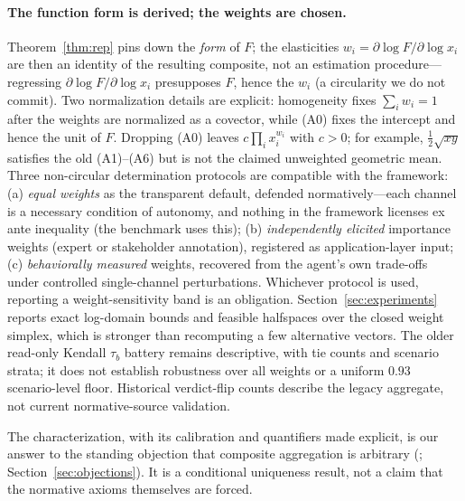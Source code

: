 \paragraph{The function form is derived; the weights are chosen.}
Theorem~\ref{thm:rep} pins down the \emph{form} of $F$; the elasticities
$w_i=\partial\log F/\partial\log x_i$ are then an identity of the resulting
composite, not an estimation procedure---regressing $\partial\log
F/\partial\log x_i$ presupposes $F$, hence the $w_i$ (a circularity we do not
commit). Two normalization details are explicit: homogeneity fixes
$\sum_iw_i=1$ after the weights are normalized as a covector, while (A0)
fixes the intercept and hence the unit of $F$. Dropping (A0) leaves
$c\prod_ix_i^{w_i}$ with $c>0$; for example, $\tfrac12\sqrt{xy}$ satisfies
the old (A1)--(A6) but is not the claimed unweighted geometric mean. Three
non-circular determination protocols are compatible with the
framework: (a) \emph{equal weights} as the transparent default, defended
normatively---each channel is a necessary condition of autonomy, and nothing
in the framework licenses ex ante inequality (the benchmark uses this);
(b) \emph{independently elicited} importance weights (expert or stakeholder
annotation), registered as application-layer input; (c) \emph{behaviorally
measured} weights, recovered from the agent's own trade-offs under controlled
single-channel perturbations. Whichever protocol is used, reporting a
weight-sensitivity band is an obligation. Section~\ref{sec:experiments}
reports exact log-domain bounds and feasible halfspaces over the closed weight
simplex, which is stronger than recomputing a few alternative vectors. The
older read-only Kendall $\tau_b$ battery remains descriptive, with tie counts
and scenario strata; it does not establish robustness over all weights or a
uniform $0.93$ scenario-level floor. Historical verdict-flip counts describe
the legacy aggregate, not current normative-source validation.

The characterization, with its calibration and quantifiers made explicit,
is our answer to the standing objection that composite aggregation is
arbitrary (\citealp{oecd2008}; Section~\ref{sec:objections}). It is a
conditional uniqueness result, not a claim that the normative axioms
themselves are forced.

